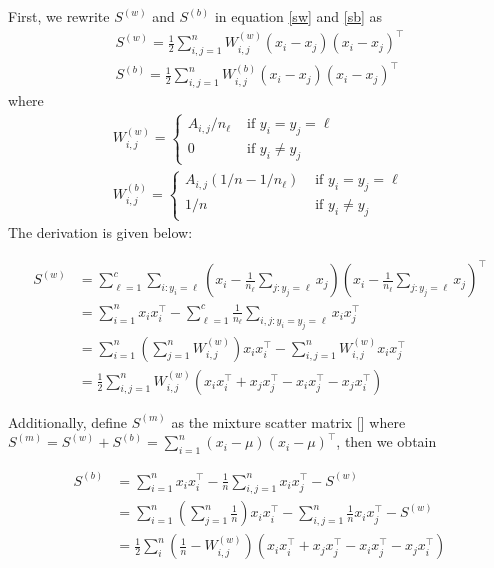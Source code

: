 \documentclass[a4paper,12pt]{article}
\begin{document}
First, we rewrite $S^{(w)}$ and $S^{(b)}$ in equation \ref{sw} and \ref{sb} as 
\begin{equation} \label{s}
\begin{array}{l}
S^{(w)}=\frac{1}{2} \sum_{i, j=1}^{n} W_{i, j}^{(w)}\left(x_{i}-x_{j}\right)\left(x_{i}-x_{j}\right)^{\top} \\
S^{(b)}=\frac{1}{2} \sum_{i, j=1}^{n} W_{i, j}^{(b)}\left(x_{i}-x_{j}\right)\left(x_{i}-x_{j}\right)^{\top}
\end{array}
\end{equation}
where 
\begin{equation} \label{w}
\begin{array}{l} 
W_{i, j}^{(w)} = \left\{\begin{array}{cl}
A_{i,j} / n_{\ell} & \text { if } y_{i}=y_{j}=\ell \\
0 & \text { if } y_{i} \neq y_{j}
\end{array}\right. \\
W_{i, j}^{(b)} = \left\{\begin{array}{cl}
A_{i,j} (1 / n-1 / n_{\ell}) & \text { if } y_{i}=y_{j}=\ell \\
1 / n & \text { if } y_{i} \neq y_{j}
\end{array}\right.
\end{array}
\end{equation}
The derivation is given below:

\begin{align*}
S^{(w)} &=\sum_{\ell=1}^{c} \sum_{i: y_{i}=\ell}\left(x_{i}-\frac{1}{n_{\ell}} \sum_{j: y_{j}=\ell} x_{j}\right)\left(x_{i}-\frac{1}{n_{\ell}} \sum_{j: y_{j}=\ell} x_{j}\right)^{\top} \\
&=\sum_{i=1}^{n} x_{i} x_{i}^{\top}-\sum_{\ell=1}^{c} \frac{1}{n_{\ell}} \sum_{i, j: y_{i}=y_{j}=\ell} x_{i} x_{j}^{\top} \\
&=\sum_{i=1}^{n}\left(\sum_{j=1}^{n} W_{i, j}^{(w)}\right) x_{i} x_{i}^{\top}-\sum_{i, j=1}^{n} W_{i, j}^{(w)} x_{i} x_{j}^{\top} \\
&=\frac{1}{2} \sum_{i, j=1}^{n} W_{i, j}^{(w)}\left(x_{i} x_{i}^{\top}+x_{j} x_{j}^{\top}-x_{i} x_{j}^{\top}-x_{j} x_{i}^{\top}\right)
\end{align*}

Additionally, define $S^{(m)}$ as the mixture scatter matrix [\cite{fukunaga2013introduction}] where $S^{(m)} = S^{(w)}+S^{(b)} =\sum_{i=1}^{n}\left(x_{i}-\mu\right)\left(x_{i}-\mu\right)^{\top}$, then we obtain

\begin{align*}
S^{(b)} &=\sum_{i=1}^{n} x_{i} x_{i}^{\top}-\frac{1}{n} \sum_{i, j=1}^{n} x_{i} x_{j}^{\top}-S^{(w)} \\
&=\sum_{i=1}^{n}\left(\sum_{j=1}^{n} \frac{1}{n}\right) x_{i} x_{i}^{\top}-\sum_{i, j=1}^{n} \frac{1}{n} x_{i} x_{j}^{\top}-S^{(w)} \\
&=\frac{1}{2} \sum_{i}^{n}\left(\frac{1}{n}-W_{i, j}^{(w)}\right)\left(x_{i} x_{i}^{\top}+x_{j} x_{j}^{\top}-x_{i} x_{j}^{\top}-x_{j} x_{i}^{\top}\right)
\end{align*}
\end{document}
